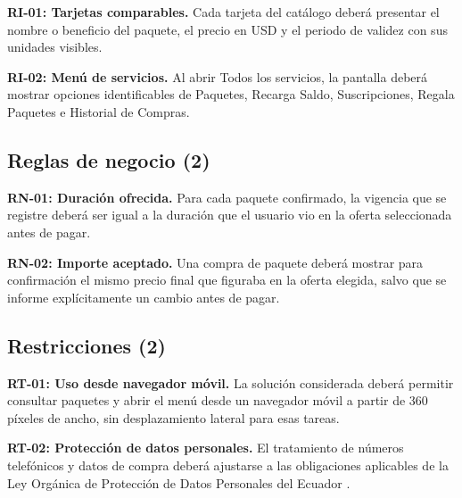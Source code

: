 \documentclass[12pt,a4paper]{article}
\begin{document}
\noindent\textbf{RI-01: Tarjetas comparables.} Cada tarjeta del catálogo deberá presentar el nombre o beneficio del paquete, el precio en USD y el periodo de validez con sus unidades visibles.


\noindent\textbf{RI-02: Menú de servicios.} Al abrir Todos los servicios, la pantalla deberá mostrar opciones identificables de Paquetes, Recarga Saldo, Suscripciones, Regala Paquetes e Historial de Compras.


\subsection{Reglas de negocio (2)}

\noindent\textbf{RN-01: Duración ofrecida.} Para cada paquete confirmado, la vigencia que se registre deberá ser igual a la duración que el usuario vio en la oferta seleccionada antes de pagar.


\noindent\textbf{RN-02: Importe aceptado.} Una compra de paquete deberá mostrar para confirmación el mismo precio final que figuraba en la oferta elegida, salvo que se informe explícitamente un cambio antes de pagar.


\subsection{Restricciones (2)}

\noindent\textbf{RT-01: Uso desde navegador móvil.} La solución considerada deberá permitir consultar paquetes y abrir el menú desde un navegador móvil a partir de 360 píxeles de ancho, sin desplazamiento lateral para esas tareas.


\noindent\textbf{RT-02: Protección de datos personales.} El tratamiento de números telefónicos y datos de compra deberá ajustarse a las obligaciones aplicables de la Ley Orgánica de Protección de Datos Personales del Ecuador \cite{leyDatos}.
\end{document}

